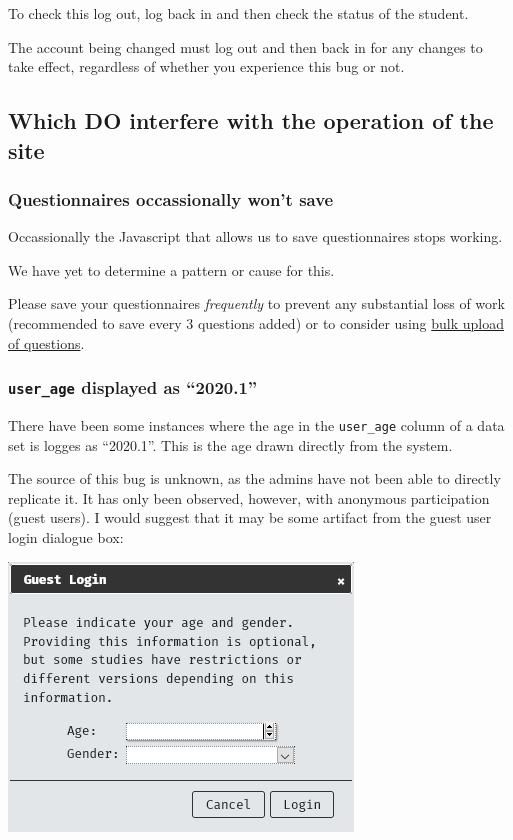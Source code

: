 \documentclass[]{book}
\begin{document}
To check this log out, log back in and then check the status of the
student.

\begin{info}
The account being changed must log out and then back in for any changes
to take effect, regardless of whether you experience this bug or not.
\end{info}

\subsection*{Which DO interfere with the operation of the
site}\label{which-do-interfere-with-the-operation-of-the-site}

\subsubsection*{Questionnaires occassionally won't
save}\label{questionnaires-occassionally-wont-save}

Occassionally the Javascript that allows us to save questionnaires stops
working.

We have yet to determine a pattern or cause for this.

Please save your questionnaires \emph{frequently} to prevent any
substantial loss of work (recommended to save every 3 questions added)
or to consider using \protect\hyperlink{addfromspreadsheet}{bulk upload
of questions}.

\subsubsection*{\texorpdfstring{\texttt{user\_age} displayed as
``2020.1''}{user\_age displayed as 2020.1}}\label{user_age}

There have been some instances where the age in the \texttt{user\_age}
column of a data set is logges as ``2020.1''. This is the age drawn
directly from the system.

The source of this bug is unknown, as the admins have not been able to
directly replicate it. It has only been observed, however, with
anonymous participation (guest users). I would suggest that it may be
some artifact from the guest user login dialogue box:

\includegraphics{images/screenshots/guest_dialogue.png}
\end{document}
